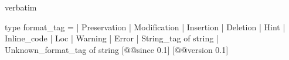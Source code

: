 \begin{camlexample}{verbatim}
\begin{caml}
\begin{camlinput}
type format_tag =
  | Preservation
  | Modification
  | Insertion
  | Deletion
  | Hint
  | Inline_code
  | Loc
  | Warning
  | Error
  | String_tag of string
  | Unknown_format_tag of string
[@@since 0.1] [@@version 0.1]
\end{camlinput}
\end{caml}
\end{camlexample}
